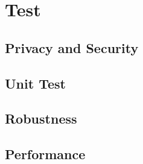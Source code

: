 \section{Test}
\subsection{Privacy and Security}
\subsection{Unit Test}
\subsection{Robustness}
\subsection{Performance}
